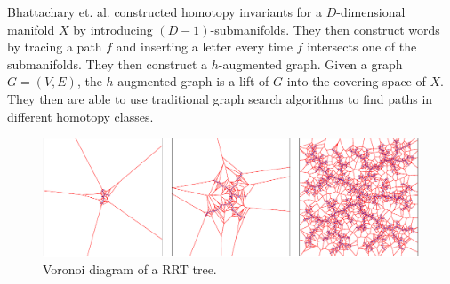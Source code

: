 \message{ !name(proposal.tex)}\documentclass[11pt,twocolumn]{article}
\begin{document}
Bhattachary et. al. \cite{bhattacharyaPathHomotopyInvariants2018}
constructed homotopy invariants for a \(D\)-dimensional manifold \(X\) by
introducing \((D - 1)\)-submanifolds. They then construct words by
tracing a path \(f\) and inserting a letter every time \(f\) intersects
one of the submanifolds. They then construct a \(h\)-augmented graph.
Given a graph \(G = (V, E)\), the \(h\)-augmented graph is a lift
of \(G\) into the covering space of \(X\). They then are able to use
traditional graph search algorithms to find paths in different homotopy
classes.

\begin{figure}[h] \centering \includegraphics[scale=.275]{rrt_voronoi}
  \caption{Voronoi diagram of a RRT tree.}
  \label{fig:rrt}
\end{figure}

 
\end{document}
